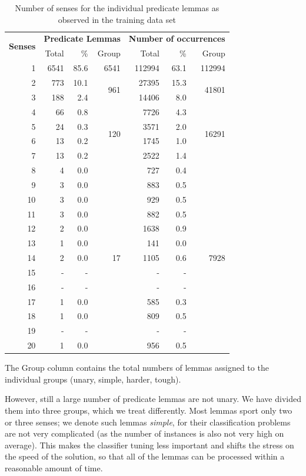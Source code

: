 \documentclass[12pt,notitlepage,a4paper]{report}
\begin{document}
\begin{table}[htb]
\caption{Number of senses for the individual predicate lemmas as observed in the training data set}\label{tab:senses-num}\footnotesize
\begin{center}
\begin{tabular}{|r|rrr|rrr|}\hline
\multirow{2}{*}{\bf Senses} & \multicolumn{3}{c|}{\bf Predicate Lemmas} & \multicolumn{3}{c|}{\bf Number of occurrences} \\
 & Total & \% & Group & Total & \% & Group \\\hline
1 & 6541 & 85.6 & 6541 & 112994 & 63.1 & 112994 \\\hline
2 & 773 & 10.1  & \multirow{2}{*}{961} & 27395 & 15.3 & \multirow{2}{*}{41801} \\
3 & 188 & 2.4 & & 14406 & 8.0 & \\\hline
4 & 66 & 0.8 & \multirow{4}{*}{120} & 7726 & 4.3 & \multirow{4}{*}{16291} \\
5 & 24 & 0.3 & & 3571 & 2.0 & \\
6 & 13 & 0.2 & & 1745 & 1.0 & \\
7 & 13 & 0.2 & & 2522 & 1.4 & \\
8 & 4 & 0.0 & & 727 & 0.4 & \\\hline
9 & 3 & 0.0 & \multirow{11}{*}{17} & 883 & 0.5 & \multirow{11}{*}{7928} \\
10 & 3 & 0.0 & & 929 & 0.5 & \\
11 & 3 & 0.0 & & 882 & 0.5 & \\
12 & 2 & 0.0 & & 1638 & 0.9 & \\
13 & 1 & 0.0 & & 141 & 0.0 & \\
14 & 2 & 0.0 & & 1105 & 0.6 & \\
15 & - & - & & - & - & \\
16 & - & - & & - & - & \\
17 & 1 & 0.0 & & 585 & 0.3 & \\
18 & 1 & 0.0 & & 809 & 0.5 & \\
19 & - & - & & - & - & \\
20 & 1 & 0.0 & & 956 & 0.5 & \\\hline
\end{tabular}
\end{center}
The Group column contains the total numbers of lemmas assigned to the individual groups (unary, simple, harder, tough).
\end{table}

However, still a large number of predicate lemmas are not unary. We have divided them into three groups, which we treat differently. Most lemmas sport only two or three senses; we denote such lemmas \emph{simple}, for their classification problems are not very complicated (as the number of instances is also not very high on average). This makes the classifier tuning less important and shifts the stress on the speed of the solution, so that all of the lemmas can be processed within a reasonable amount of time.
\end{document}
